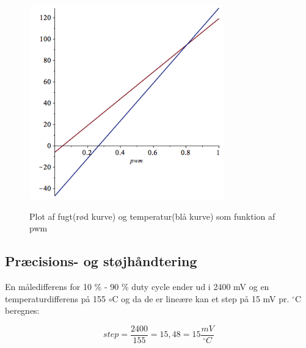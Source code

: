 \begin{figure}[htb]
\centering
{\includegraphics[width=0.75\textwidth]{filer/design/Billeder/sht_plot_maple.png}}
\caption{Plot af fugt(rød kurve) og temperatur(blå kurve) som funktion af pwm}
\label{lab:sht_plot_mable}
\end{figure}

\subsection{Præcisions- og støjhåndtering}
En måledifferens for 10 \% - 90 \% duty cycle ender ud i 2400 mV og en temperaturdifferens på 155 ${\circ}$C og da de er lineære kan et step på 15 mV pr. $^{\circ}$C beregnes:

\begin{equation}
step = \frac{2400}{155} = 15,48 = 15 \frac{mV}{^{\circ}C}
\end{equation}

